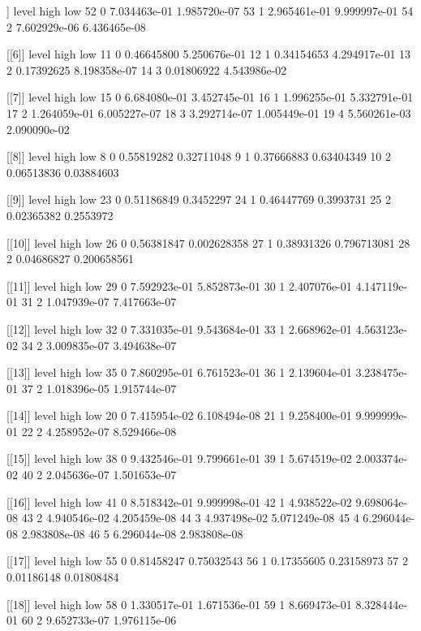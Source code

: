\documentclass[letterpaper,10pt]{amsart}
\newenvironment{verbatimcode}{\bigskip \scriptsize \verbatim}{\endverbatim \normalsize \bigskip}
\begin{document}
\begin{enumerate}[(1)]
\begin{verbatimcode}
[[5]]
   level         high          low
52     0 7.034463e-01 1.985720e-07
53     1 2.965461e-01 9.999997e-01
54     2 7.602929e-06 6.436465e-08

[[6]]
   level       high          low
11     0 0.46645800 5.250676e-01
12     1 0.34154653 4.294917e-01
13     2 0.17392625 8.198358e-07
14     3 0.01806922 4.543986e-02

[[7]]
   level         high          low
15     0 6.684080e-01 3.452745e-01
16     1 1.996255e-01 5.332791e-01
17     2 1.264059e-01 6.005227e-07
18     3 3.292714e-07 1.005449e-01
19     4 5.560261e-03 2.090090e-02

[[8]]
   level       high        low
8      0 0.55819282 0.32711048
9      1 0.37666883 0.63404349
10     2 0.06513836 0.03884603

[[9]]
   level       high       low
23     0 0.51186849 0.3452297
24     1 0.46447769 0.3993731
25     2 0.02365382 0.2553972

[[10]]
   level       high         low
26     0 0.56381847 0.002628358
27     1 0.38931326 0.796713081
28     2 0.04686827 0.200658561

[[11]]
   level         high          low
29     0 7.592923e-01 5.852873e-01
30     1 2.407076e-01 4.147119e-01
31     2 1.047939e-07 7.417663e-07

[[12]]
   level         high          low
32     0 7.331035e-01 9.543684e-01
33     1 2.668962e-01 4.563123e-02
34     2 3.009835e-07 3.494638e-07

[[13]]
   level         high          low
35     0 7.860295e-01 6.761523e-01
36     1 2.139604e-01 3.238475e-01
37     2 1.018396e-05 1.915744e-07

[[14]]
   level         high          low
20     0 7.415954e-02 6.108494e-08
21     1 9.258400e-01 9.999999e-01
22     2 4.258952e-07 8.529466e-08

[[15]]
   level         high          low
38     0 9.432546e-01 9.799661e-01
39     1 5.674519e-02 2.003374e-02
40     2 2.045636e-07 1.501653e-07

[[16]]
   level         high          low
41     0 8.518342e-01 9.999998e-01
42     1 4.938522e-02 9.698064e-08
43     2 4.940546e-02 4.205459e-08
44     3 4.937498e-02 5.071249e-08
45     4 6.296044e-08 2.983808e-08
46     5 6.296044e-08 2.983808e-08

[[17]]
   level       high        low
55     0 0.81458247 0.75032543
56     1 0.17355605 0.23158973
57     2 0.01186148 0.01808484

[[18]]
   level         high          low
58     0 1.330517e-01 1.671536e-01
59     1 8.669473e-01 8.328444e-01
60     2 9.652733e-07 1.976115e-06


\end{verbatimcode}
\end{enumerate}
\end{document}
